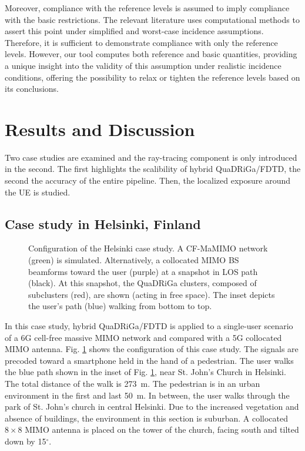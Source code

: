 \documentclass{IEEEtran}
\begin{document}
Moreover, compliance with the reference levels is assumed to imply compliance with the basic restrictions. The relevant literature uses computational methods to assert this point under simplified and worst-case incidence assumptions. Therefore, it is sufficient to demonstrate compliance with only the reference levels. However, our tool computes both reference and basic quantities, providing a unique insight into the validity of this assumption under realistic incidence conditions, offering the possibility to relax or tighten the reference levels based on its conclusions.

\section{Results and Discussion}
Two case studies are examined and the ray-tracing component is only introduced in the second. The first highlights the scalibility of hybrid \gls{QuaDRiGa}/\gls{FDTD}, the second the accuracy of the entire pipeline. Then, the localized exposure around the \gls{UE} is studied.
\subsection{Case study in Helsinki, Finland}
\begin{figure}[t]
    \centering
    
    \caption{Configuration of the Helsinki case study. A \gls{CF-MaMIMO} network (green) is simulated. Alternatively, a collocated MIMO \gls{BS} beamforms toward the user (purple) at a snapshot in LOS path (black). At this snapshot, the \gls{QuaDRiGa} clusters, composed of subclusters (red), are shown (acting in free space). The inset depicts the user’s path (blue) walking from bottom to top.}
    \label{fig:helsinki_config}
\end{figure}
In this case study, hybrid \gls{QuaDRiGa}/\gls{FDTD} is applied to a single-user scenario of a \gls{6G} cell-free massive MIMO network and compared with a \gls{5G} collocated MIMO antenna. Fig. \ref{fig:helsinki_config} shows the configuration of this case study. 
The signals are precoded toward a smartphone held in the hand of a pedestrian. The user walks the blue path shown in the inset of Fig. \ref{fig:helsinki_config}, near St. John's Church in Helsinki. The total distance of the walk is 273~m. The pedestrian is in an urban environment in the first and last 50~m. In between, the user walks through the park of St. John's church in central Helsinki. Due to the increased vegetation and absence of buildings, the environment in this section is suburban. A collocated $8\times 8$ MIMO antenna is placed on the tower of the church, facing south and tilted down by 15$^\circ$.
\end{document}
